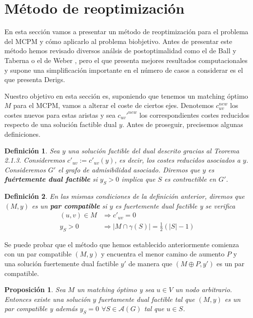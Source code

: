 \documentclass[twoside,a4paper,openright,12pt]{book}
\newtheorem{defi}{Definici\'on}[section]
\newtheorem{prop}{Proposici\'on}[section]
\begin{document}
\section{Método de reoptimización}
En esta sección vamos a presentar un método de reoptimización para el problema del MCPM y cómo aplicarlo al problema biobjetivo. Antes de presentar este método hemos revisado diversos análsis de postoptimalidad como el de Ball y Taberna \cite{balltab} o el de Weber \cite{webber}, pero el que presenta mejores resultados computacionales y supone una simplificación importante en el número de casos a considerar es el que presenta Derigs. 

Nuestro objetivo en esta sección es, suponiendo que tenemos un matching óptimo $M$ para el MCPM, vamos a alterar el coste de ciertos ejes. Denotemos $c_{uv}^{new}$ los costes nuevos para estas aristas y sea $c_{uv}'^{new}$ los correspondientes costes reducidos respecto de una solución factible dual $y$. Antes de proseguir, precisemos algunas definiciones.
\begin{defi}
Sea $y$ una solución factible del dual descrito gracias al Teorema 2.1.3. Consideremos $c'_{uv}:=c'_{uv}(y)$, es decir, los costes reducidos asociados a $y$. Consideremos $G'$ el grafo de admisibilidad asociado. Diremos que $y$ es \textbf{fuértemente dual factible} si $y_S>0$ implica que $S$ es contractible en $G'$.
\end{defi}
\begin{defi}
En las mismas condiciones de la definición anterior, diremos que $(M,y)$ es un \textbf{par compatible} si $y$ es fuertemente dual factible y se verifica
\begin{align*}
(u,v)\in M &\Rightarrow c'_{uv} = 0\\
y_S>0&\Rightarrow |M\cap \gamma(S)| = \frac{1}{2}(|S|-1)
\end{align*}
\end{defi}
Se puede probar que el método que hemos establecido anteriormente comienza con un par compatible $(M,y)$ y encuentra el menor camino de aumento $P$ y una solución fuertemente dual factible $y'$ de manera que $(M\oplus P,y')$ es un par compatible.
\begin{prop}
Sea $M$ un matching óptimo y sea $u\in V$ un nodo arbitrario. Entonces existe una solución $y$ fuertamente dual factible tal que $(M,y)$ es un par compatible y además $y_S=0$ $\forall S \in \mathcal{A}(G)$ tal que $u \in S$.
\end{prop}
\end{document}
